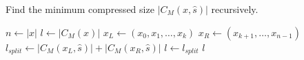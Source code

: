 \begin{algorithm}
	\caption{\label{alg:rec}Find the minimum compressed size $|C_M(x,\hat s)|$ recursively.}
\begin{algorithmic}
\STATE $n \gets |x|$
\STATE $l \gets |C_M(x)|$
		\STATE $x_L \gets (x_0,x_1,\dots,x_k)$
		\STATE $x_R \gets (x_{k+1},\dots,x_{n-1})$
		\STATE $l_{split} \gets |C_M(x_L,\hat s)| + |C_M(x_R,\hat s)|$
			\STATE $l \gets l_{split}$
		\ENDIF
	\ENDFOR
\ENDIF
\RETURN $l$
\end{algorithmic}
\end{algorithm}
